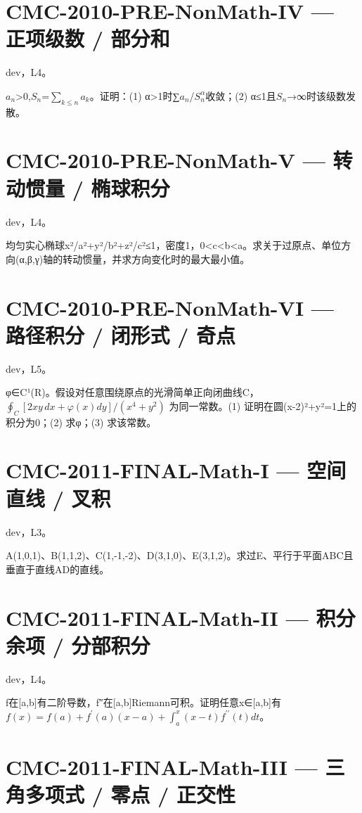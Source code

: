\documentclass[UTF8]{ctexart}
\begin{document}
\section*{CMC-2010-PRE-NonMath-IV — 正项级数 / 部分和}

dev，L4。

$a_n$>0,$S_n$=$∑_{k≤n}$$a_k$。证明：(1) α>1时∑$a_n$/$S_n^α$收敛；(2) α≤1且$S_n$→∞时该级数发散。

\section*{CMC-2010-PRE-NonMath-V — 转动惯量 / 椭球积分}

dev，L4。

均匀实心椭球x²/a²+y²/b²+z²/c²≤1，密度1，0<c<b<a。求关于过原点、单位方向(α,β,γ)轴的转动惯量，并求方向变化时的最大最小值。

\section*{CMC-2010-PRE-NonMath-VI — 路径积分 / 闭形式 / 奇点}

dev，L5。

φ∈C¹(R)。假设对任意围绕原点的光滑简单正向闭曲线C，$\oint_C[2xy\,dx+\varphi(x)dy]/(x^4+y^2)$ 为同一常数。(1) 证明在圆(x-2)²+y²=1上的积分为0；(2) 求φ；(3) 求该常数。

\section*{CMC-2011-FINAL-Math-I — 空间直线 / 叉积}

dev，L3。

A(1,0,1)、B(1,1,2)、C(1,-1,-2)、D(3,1,0)、E(3,1,2)。求过E、平行于平面ABC且垂直于直线AD的直线。

\section*{CMC-2011-FINAL-Math-II — 积分余项 / 分部积分}

dev，L4。

f在[a,b]有二阶导数，f″在[a,b]Riemann可积。证明任意x∈[a,b]有 $f(x)=f(a)+f^{\prime}(a)(x-a)+\int_a^x(x-t)f^{\prime\prime}(t)dt$。

\section*{CMC-2011-FINAL-Math-III — 三角多项式 / 零点 / 正交性}
\end{document}
